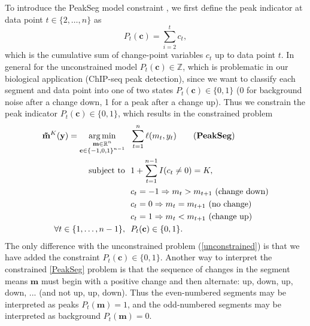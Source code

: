 \documentclass{article}
\DeclareMathOperator*{\argmin}{arg\,min}
\newcommand{\ZZ}{\mathbb Z}
\newcommand{\RR}{\mathbb R}
\begin{document}
To introduce the PeakSeg model constraint \citep{PeakSeg}, we first define
the peak indicator at data point $t\in\{2, \dots, n\}$ as
\begin{equation}
  \label{eq:peaks}
  P_t(\mathbf c) = \sum_{i=2}^t c_t,
\end{equation}
which is the cumulative sum of change-point variables $c_t$ up to data
point $t$. In general for the unconstrained model
$P_t(\mathbf c)\in\ZZ$, which is problematic in our biological
application (ChIP-seq peak detection), since we want to classify each
segment and data point into one of two states
$P_t(\mathbf c)\in \{0, 1\}$ (0 for background noise after a change
down, 1 for a peak after a change up).
Thus we constrain the peak indicator $P_t(\mathbf
c)\in\{0, 1\}$, which results
in the constrained problem
\begin{align}
  \label{PeakSeg}
  \mathbf{\tilde m}^K(\mathbf y) =
    \argmin_{\substack{
  \mathbf m\in\RR^{n}
\\
  \mathbf c\in\{-1,0,1\}^{n-1}
  }} &\ \ 
    \sum_{t=1}^n \ell( m_t,  y_t) 
\tag{\textbf{PeakSeg}}
\\
    \text{subject to} &\ \  1+\sum_{t=1}^{n-1} I(c_t \neq 0) = K, 
\nonumber\\
& \ \ c_t = -1 \Rightarrow m_{t} > m_{t+1} \text{ (change down)}
\nonumber\\
& \ \ c_t = 0 \Rightarrow m_{t} = m_{t+1}  \text{ (no change)}
\nonumber\\
& \ \ c_t = 1 \Rightarrow m_{t} < m_{t+1} \text{ (change up)}
\nonumber\\
\forall t\in\{1, \dots, n-1\}, &\ \ P_t(\mathbf c) \in\{0, 1\}.
\nonumber
\end{align}
The only difference with the unconstrained problem
(\ref{unconstrained}) is that we have added the constraint
$P_t(\mathbf c) \in\{0, 1\}$. Another way to interpret the constrained
\ref{PeakSeg} problem is that the sequence of changes in the segment
means $\mathbf m$ must begin with a positive change and then
alternate: up, down, up, down, ... (and not up, up, down). Thus the
even-numbered segments may be interpreted as peaks $P_t(\mathbf m)=1$,
and the odd-numbered segments may be interpreted as background
$P_t(\mathbf m)=0$.
\end{document}
